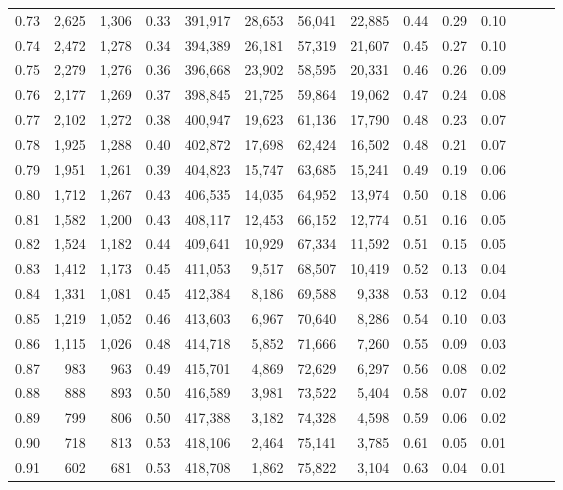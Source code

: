 \begin{tabular}{rrrrrrrrrrrrrr}
0.73 &  2,625 &  1,306 &  0.33 &  391,917 &   28,653 &  56,041 &  22,885 &  0.44 &  0.29 &      0.10 \\
0.74 &  2,472 &  1,278 &  0.34 &  394,389 &   26,181 &  57,319 &  21,607 &  0.45 &  0.27 &      0.10 \\
0.75 &  2,279 &  1,276 &  0.36 &  396,668 &   23,902 &  58,595 &  20,331 &  0.46 &  0.26 &      0.09 \\
0.76 &  2,177 &  1,269 &  0.37 &  398,845 &   21,725 &  59,864 &  19,062 &  0.47 &  0.24 &      0.08 \\
0.77 &  2,102 &  1,272 &  0.38 &  400,947 &   19,623 &  61,136 &  17,790 &  0.48 &  0.23 &      0.07 \\
0.78 &  1,925 &  1,288 &  0.40 &  402,872 &   17,698 &  62,424 &  16,502 &  0.48 &  0.21 &      0.07 \\
0.79 &  1,951 &  1,261 &  0.39 &  404,823 &   15,747 &  63,685 &  15,241 &  0.49 &  0.19 &      0.06 \\
0.80 &  1,712 &  1,267 &  0.43 &  406,535 &   14,035 &  64,952 &  13,974 &  0.50 &  0.18 &      0.06 \\
0.81 &  1,582 &  1,200 &  0.43 &  408,117 &   12,453 &  66,152 &  12,774 &  0.51 &  0.16 &      0.05 \\
0.82 &  1,524 &  1,182 &  0.44 &  409,641 &   10,929 &  67,334 &  11,592 &  0.51 &  0.15 &      0.05 \\
0.83 &  1,412 &  1,173 &  0.45 &  411,053 &    9,517 &  68,507 &  10,419 &  0.52 &  0.13 &      0.04 \\
0.84 &  1,331 &  1,081 &  0.45 &  412,384 &    8,186 &  69,588 &   9,338 &  0.53 &  0.12 &      0.04 \\
0.85 &  1,219 &  1,052 &  0.46 &  413,603 &    6,967 &  70,640 &   8,286 &  0.54 &  0.10 &      0.03 \\
0.86 &  1,115 &  1,026 &  0.48 &  414,718 &    5,852 &  71,666 &   7,260 &  0.55 &  0.09 &      0.03 \\
0.87 &    983 &    963 &  0.49 &  415,701 &    4,869 &  72,629 &   6,297 &  0.56 &  0.08 &      0.02 \\
0.88 &    888 &    893 &  0.50 &  416,589 &    3,981 &  73,522 &   5,404 &  0.58 &  0.07 &      0.02 \\
0.89 &    799 &    806 &  0.50 &  417,388 &    3,182 &  74,328 &   4,598 &  0.59 &  0.06 &      0.02 \\
0.90 &    718 &    813 &  0.53 &  418,106 &    2,464 &  75,141 &   3,785 &  0.61 &  0.05 &      0.01 \\
0.91 &    602 &    681 &  0.53 &  418,708 &    1,862 &  75,822 &   3,104 &  0.63 &  0.04 &      0.01 \\

\end{tabular}
